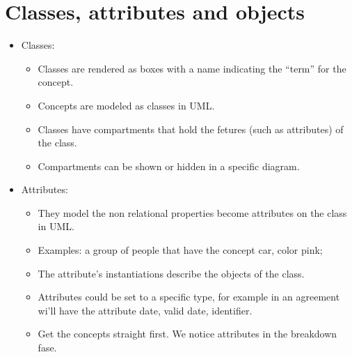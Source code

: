 \section{Classes, attributes and objects}
\begin{itemize}
    \item Classes:
        \begin{itemize}
            \item Classes are rendered as boxes with a name indicating the ``term'' for the concept.
            \item Concepts are modeled as classes in UML.
            \item Classes have compartments that hold the fetures (such as attributes) of the class.
            \item Compartments can be shown or hidden in a specific diagram. 
        \end{itemize}
    
    \item Attributes:
        \begin{itemize}
            \item They model the non relational properties become attributes on the class in UML. 
            \item Examples: a group of people that have the concept car, color pink; 
            \item The attribute's instantiations describe the objects of the class.
            \item Attributes could be set to a specific type, for example in an agreement wi'll have the attribute date, valid date, identifier.
            \item Get the concepts straight first. We notice attributes in the breakdown fase.
        \end{itemize}
    

\end{itemize}
